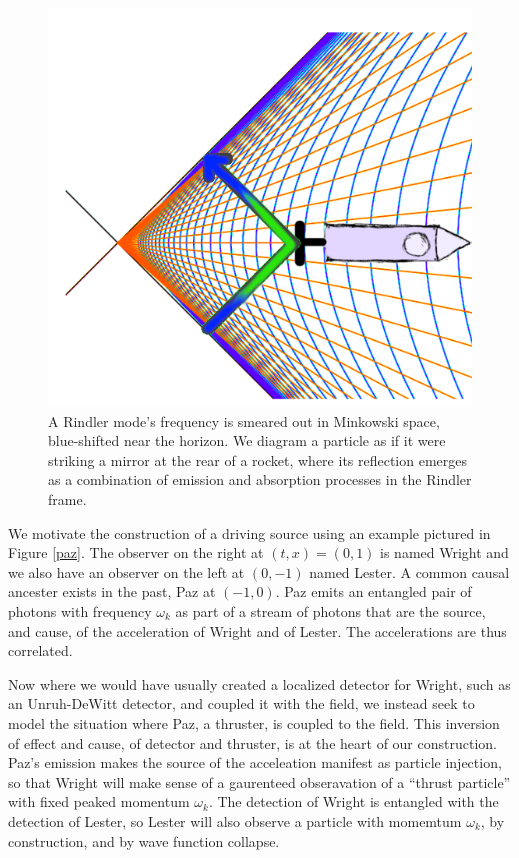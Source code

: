\documentclass[12pt,a4paper]{article}
\begin{document}
\begin{figure}[h]
\centering
\includegraphics[scale=1.5]{emit_absorb.png}
\captionsetup{width=0.7\textwidth}
\caption{
  A Rindler mode's frequency is smeared out in Minkowski space, blue-shifted near the horizon. We diagram a particle as if it were striking a mirror at the rear of a rocket, where its reflection emerges as a combination of emission and absorption processes in the Rindler frame.}
\label{emit_absorb}
\end{figure}

We motivate the construction of a driving source using an example pictured in Figure \ref{paz}.  The observer on the right at $(t,x) = (0,1)$ is named Wright and we also have an observer on the left at $(0,-1)$ named Lester.  A common causal ancester exists in the past, Paz at $(-1,0)$. Paz emits an entangled pair of photons with frequency $\omega_k$ as part of a stream of photons that are the source, and cause, of the acceleration of Wright and of Lester.  The accelerations are thus correlated.

Now where we would have usually created a localized detector for Wright, such as an Unruh-DeWitt detector, and coupled it with the field, we instead seek to model the situation where Paz, a thruster, is coupled to the field. This inversion of effect and cause, of detector and thruster, is at the heart of our construction. Paz's emission makes the source of the acceleation manifest as particle injection, so that Wright will make sense of a gaurenteed obseravation of a ``thrust particle'' with fixed peaked momentum $\omega_k$.  The detection of Wright is entangled with the detection of Lester, so Lester will also observe a particle with momemtum $\omega_k$, by construction, and by wave function collapse.
\end{document}
